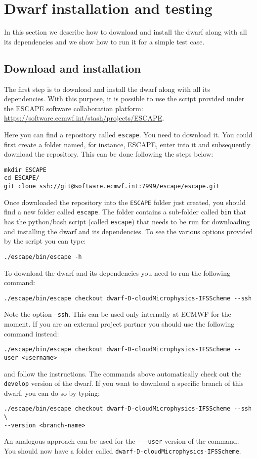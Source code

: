 \documentclass[
a4paper,     %
12pt,        %
article,
onecolumn,   %
openany,     %
]{memoir}
\newcommand{\inlsh}[1]{\texttt{#1}}
\newcommand{\inlsh}[1]{\tikz[anchor=base,baseline]\node[inner sep=2pt,
outer sep=0,draw=yellow!10,fill=yellow!10]{\texttt{#1}};}
\begin{document}
\section{Dwarf installation and testing}
In this section we describe how to download and install 
the dwarf along with all its dependencies and we show 
how to run it for a simple test case.



\subsection{Download and installation}
The first step is to download and install the dwarf along 
with all its dependencies. With this purpose, it is possible 
to use the script provided under the ESCAPE software collaboration 
platform:\\
\url{https://software.ecmwf.int/stash/projects/ESCAPE}.

Here you can find a repository called \inlsh{escape}.
You need to download it. You could first create a 
folder named, for instance, ESCAPE, enter into it 
and subsequently download the repository. 
This can be done following the steps below:
%
\begin{lstlisting}[style=BashStyle]
mkdir ESCAPE
cd ESCAPE/
git clone ssh://git@software.ecmwf.int:7999/escape/escape.git
\end{lstlisting}
%
Once downloaded the repository into the \inlsh{ESCAPE} folder 
just created, you should find a new folder called \inlsh{escape}. 
The folder contains a sub-folder called \inlsh{bin} that has the 
python/bash script (called \inlsh{escape}) that needs to be 
run for downloading and installing the dwarf and its dependencies. 
To see the various options provided by the script you can type:
%
\begin{lstlisting}[style=BashStyle]
./escape/bin/escape -h
\end{lstlisting}
%
To download the dwarf and its dependencies you need to run 
the following command:
%
\begin{lstlisting}[style=BashStyle]
./escape/bin/escape checkout dwarf-D-cloudMicrophysics-IFSScheme --ssh
\end{lstlisting}
% 
Note the option \inlsh{--ssh}. This can be used only internally 
at ECMWF for the moment. If you are an external project partner
you should use the following command instead:
%
\begin{lstlisting}[style=BashStyle]
./escape/bin/escape checkout dwarf-D-cloudMicrophysics-IFSScheme --user <username>
\end{lstlisting}
% 
and follow the instructions. 
The commands above automatically check out the \inlsh{develop}
version of the dwarf. If you want to download a specific branch 
of this dwarf, you can do so by typing:
%
\begin{lstlisting}[style=BashStyle]
./escape/bin/escape checkout dwarf-D-cloudMicrophysics-IFSScheme --ssh \
--version <branch-name>
\end{lstlisting}
% 
An analogous approach can be used for the \inlsh{-\,-user} 
version of the command. You should now have a folder called 
\inlsh{dwarf-D-cloudMicrophysics-IFSScheme}.
\end{document}
